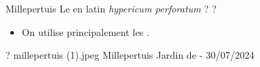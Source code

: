 \ficheidentiteplante
{Millepertuis}
{%
    Le  en latin \textit{hypericum perforatum}
}
{%
    ?
}
{%
    ?
}
{%
    \begin{itemize}[label = \bcplume]
        \item On utilise principalement les .
    \end{itemize}
}
{%
    ?
}
{%
    millepertuis (1).jpeg
}
{%
    Millepertuis
}
{%
    Jardin de  - 30/07/2024 
}